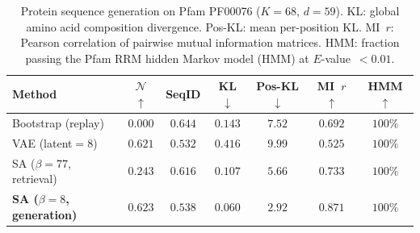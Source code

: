 \begin{table}[t]
\centering
\caption{Protein sequence generation on Pfam PF00076 ($K{=}68$, $d{=}59$). KL: global amino acid composition divergence. Pos-KL: mean per-position KL. MI~$r$: Pearson correlation of pairwise mutual information matrices. HMM: fraction passing the Pfam RRM hidden Markov model (HMM) at $E$-value~$<0.01$.}
\label{tab:protein-main}
\small
\begin{tabular}{@{}lcccccc@{}}
\toprule
Method & $\mathcal{N}$ $\uparrow$ & SeqID & KL $\downarrow$ & Pos-KL $\downarrow$ & MI~$r$ $\uparrow$ & HMM $\uparrow$ \\
\midrule
Bootstrap (replay)                  & $0.000$ & $0.644$ & $0.143$ & $7.52$ & $0.692$ & $100\%$ \\
VAE (latent${=}8$)                  & $0.621$ & $0.532$ & $0.416$ & $9.99$ & $0.525$ & $100\%$ \\
SA ($\beta{=}77$, retrieval)        & $0.243$ & $0.616$ & $0.107$ & $5.66$ & $0.733$ & $100\%$ \\
\textbf{SA ($\beta{=}8$, generation)} & $\mathbf{0.623}$ & $0.538$ & $\mathbf{0.060}$ & $\mathbf{2.92}$ & $\mathbf{0.871}$ & $100\%$ \\
\bottomrule
\end{tabular}
\end{table}

